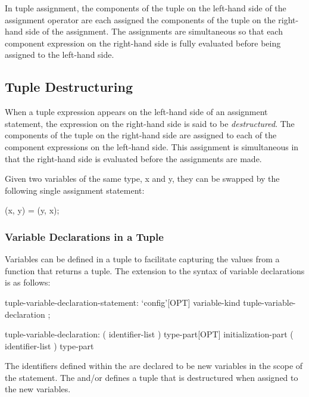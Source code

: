 In tuple assignment, the components of the tuple on the left-hand
side of the assignment operator are each assigned the components of
the tuple on the right-hand side of the assignment.  The assignments
are simultaneous so that each component expression on the right-hand
side is fully evaluated before being assigned to the left-hand side.

\subsection{Tuple Destructuring}
\label{Tuple_Destructuring}

When a tuple expression appears on the left-hand side of an assignment
statement, the expression on the right-hand side is said to be {\em
destructured}.  The components of the tuple on the right-hand side are
assigned to each of the component expressions on the left-hand side.
This assignment is simultaneous in that the right-hand side is
evaluated before the assignments are made.
\begin{example}
Given two variables of the same type, x and y, they can be swapped by
the following single assignment statement:
\begin{chapel}
(x, y) = (y, x);
\end{chapel}
\end{example}

\subsubsection{Variable Declarations in a Tuple}
\label{Variable_Declarations_in_a_Tuple}

Variables can be defined in a tuple to facilitate capturing the values
from a function that returns a tuple.  The extension to the syntax of
variable declarations is as follows:
\begin{syntax}
tuple-variable-declaration-statement:
  `config'[OPT] variable-kind tuple-variable-declaration ;

tuple-variable-declaration:
  ( identifier-list ) type-part[OPT] initialization-part
  ( identifier-list ) type-part
\end{syntax}
The identifiers defined within the  are declared
to be new variables in the scope of the statement.  The
 and/or  defines a tuple
that is destructured when assigned to the new variables.

